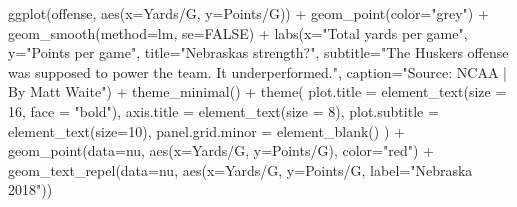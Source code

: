 \documentclass[
  letterpaper,
  DIV=11,
  numbers=noendperiod]{scrreprt}
\newenvironment{Shaded}{\begin{snugshade}}{\end{snugshade}}
\newcommand{\AttributeTok}[1]{\textcolor[rgb]{0.40,0.45,0.13}{#1}}
\newcommand{\ConstantTok}[1]{\textcolor[rgb]{0.56,0.35,0.01}{#1}}
\newcommand{\DecValTok}[1]{\textcolor[rgb]{0.68,0.00,0.00}{#1}}
\newcommand{\FunctionTok}[1]{\textcolor[rgb]{0.28,0.35,0.67}{#1}}
\newcommand{\NormalTok}[1]{\textcolor[rgb]{0.00,0.23,0.31}{#1}}
\newcommand{\SpecialCharTok}[1]{\textcolor[rgb]{0.37,0.37,0.37}{#1}}
\newcommand{\StringTok}[1]{\textcolor[rgb]{0.13,0.47,0.30}{#1}}
\begin{document}
\begin{Shaded}
\begin{Highlighting}[]
\FunctionTok{ggplot}\NormalTok{(offense, }\FunctionTok{aes}\NormalTok{(}\AttributeTok{x=}\StringTok{\textasciigrave{}}\AttributeTok{Yards/G}\StringTok{\textasciigrave{}}\NormalTok{, }\AttributeTok{y=}\StringTok{\textasciigrave{}}\AttributeTok{Points/G}\StringTok{\textasciigrave{}}\NormalTok{)) }\SpecialCharTok{+} 
  \FunctionTok{geom\_point}\NormalTok{(}\AttributeTok{color=}\StringTok{"grey"}\NormalTok{) }\SpecialCharTok{+} \FunctionTok{geom\_smooth}\NormalTok{(}\AttributeTok{method=}\NormalTok{lm, }\AttributeTok{se=}\ConstantTok{FALSE}\NormalTok{) }\SpecialCharTok{+} 
  \FunctionTok{labs}\NormalTok{(}\AttributeTok{x=}\StringTok{"Total yards per game"}\NormalTok{, }\AttributeTok{y=}\StringTok{"Points per game"}\NormalTok{, }\AttributeTok{title=}\StringTok{"Nebraska\textquotesingle{}s strength?"}\NormalTok{, }\AttributeTok{subtitle=}\StringTok{"The Husker\textquotesingle{}s offense was supposed to power the team. It underperformed."}\NormalTok{, }\AttributeTok{caption=}\StringTok{"Source: NCAA | By Matt Waite"}\NormalTok{) }\SpecialCharTok{+} 
  \FunctionTok{theme\_minimal}\NormalTok{() }\SpecialCharTok{+} 
  \FunctionTok{theme}\NormalTok{(}
    \AttributeTok{plot.title =} \FunctionTok{element\_text}\NormalTok{(}\AttributeTok{size =} \DecValTok{16}\NormalTok{, }\AttributeTok{face =} \StringTok{"bold"}\NormalTok{),}
    \AttributeTok{axis.title =} \FunctionTok{element\_text}\NormalTok{(}\AttributeTok{size =} \DecValTok{8}\NormalTok{), }
    \AttributeTok{plot.subtitle =} \FunctionTok{element\_text}\NormalTok{(}\AttributeTok{size=}\DecValTok{10}\NormalTok{), }
    \AttributeTok{panel.grid.minor =} \FunctionTok{element\_blank}\NormalTok{()}
\NormalTok{    ) }\SpecialCharTok{+}
  \FunctionTok{geom\_point}\NormalTok{(}\AttributeTok{data=}\NormalTok{nu, }\FunctionTok{aes}\NormalTok{(}\AttributeTok{x=}\StringTok{\textasciigrave{}}\AttributeTok{Yards/G}\StringTok{\textasciigrave{}}\NormalTok{, }\AttributeTok{y=}\StringTok{\textasciigrave{}}\AttributeTok{Points/G}\StringTok{\textasciigrave{}}\NormalTok{), }\AttributeTok{color=}\StringTok{"red"}\NormalTok{) }\SpecialCharTok{+} 
  \FunctionTok{geom\_text\_repel}\NormalTok{(}\AttributeTok{data=}\NormalTok{nu, }\FunctionTok{aes}\NormalTok{(}\AttributeTok{x=}\StringTok{\textasciigrave{}}\AttributeTok{Yards/G}\StringTok{\textasciigrave{}}\NormalTok{, }\AttributeTok{y=}\StringTok{\textasciigrave{}}\AttributeTok{Points/G}\StringTok{\textasciigrave{}}\NormalTok{, }\AttributeTok{label=}\StringTok{"Nebraska 2018"}\NormalTok{))}
\end{Highlighting}
\end{Shaded}
\end{document}

